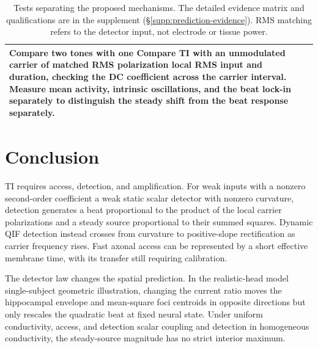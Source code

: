 \documentclass[11pt,a4paper]{article}
\providecommand{\DIFaddtex}[1]{{\protect\color{blue} \sf #1}} %
\providecommand{\DIFdeltex}[1]{{\protect\color{red} \scriptsize #1}} %
\providecommand{\DIFaddbegin}{} %
\providecommand{\DIFaddend}{} %
\providecommand{\DIFdelbegin}{} %
\providecommand{\DIFdelend}{} %
\providecommand{\DIFaddFL}[1]{\DIFadd{#1}} %
\providecommand{\DIFdelFL}[1]{\DIFdel{#1}} %
\providecommand{\DIFaddbeginFL}{} %
\providecommand{\DIFaddendFL}{} %
\providecommand{\DIFdelbeginFL}{} %
\providecommand{\DIFdelendFL}{} %
\providecommand{\DIFadd}[1]{\texorpdfstring{\DIFaddtex{#1}}{#1}} %
\providecommand{\DIFdel}[1]{\texorpdfstring{\DIFdeltex{#1}}{}} %
\begin{document}
\begin{table}[htbp]
\begin{tabular}{@{}>{\raggedright\arraybackslash}p{}
 >{\raggedright\arraybackslash}p{}@{}}
{The corresponding spiking-network and in vivo controls are not provided here.
}%
\DIFdelFL{Compare two tones with one }\DIFdelendFL \DIFaddbeginFL \DIFaddFL{Compare TI with an unmodulated }\DIFaddendFL carrier
of matched \DIFdelbeginFL \DIFdelFL{RMS polarization }\DIFdelendFL \DIFaddbeginFL \DIFaddFL{local RMS input }\DIFaddendFL and duration, checking the DC coefficient across
the carrier interval. Measure mean activity, intrinsic oscillations, and \DIFaddbeginFL \DIFaddFL{the
}\DIFaddendFL beat \DIFdelbeginFL \DIFdelFL{lock-in separately to distinguish the
steady
shift from the beat response}\DIFdelendFL \DIFaddbeginFL \DIFaddFL{separately}\DIFaddendFL . \\
\DIFdelbeginFL %
\DIFdelendFL \DIFaddbeginFL \bottomrule
\end{tabular}
\caption{\DIFaddFL{Tests separating the proposed mechanisms. The detailed evidence matrix
and qualifications are in the supplement (\S\ref{supp:prediction-evidence}).
RMS matching refers to the detector input, not electrode or tissue power.}}
\label{tab:predictions}
\end{table}
\DIFaddend

\section{Conclusion}
TI requires access, detection, and amplification. For \DIFdelbegin \DIFdel{weak inputs with a
nonzero second-order coefficient}\DIFdelend \DIFaddbegin \DIFadd{a weak static scalar
detector with nonzero curvature}\DIFaddend , detection generates a beat proportional
to the product of the local carrier polarizations and a steady source
proportional to their summed squares. \DIFaddbegin \DIFadd{Dynamic QIF detection instead crosses
from curvature to positive-slope rectification as carrier frequency rises.
}\DIFaddend Fast axonal access can be represented
by a short effective membrane time, with its transfer still requiring calibration.

The detector law changes the spatial prediction. In the \DIFdelbegin \DIFdel{realistic-head
model}\DIFdelend \DIFaddbegin \DIFadd{single-subject
geometric illustration}\DIFaddend , changing the current ratio moves the \DIFaddbegin \DIFadd{hippocampal
}\DIFaddend envelope and mean-square \DIFdelbegin \DIFdel{foci }\DIFdelend \DIFaddbegin \DIFadd{centroids }\DIFaddend in opposite directions but only rescales the quadratic beat at fixed
neural state. Under uniform \DIFdelbegin \DIFdel{conductivity, access, and detection }\DIFdelend \DIFaddbegin \DIFadd{scalar coupling and detection in homogeneous conductivity}\DIFaddend , the
steady-source magnitude has no strict interior maximum.
\end{document}
